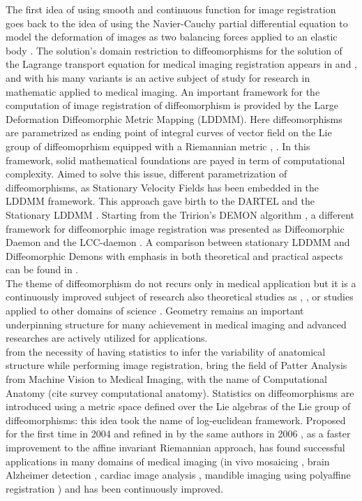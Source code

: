 The first idea of using smooth and continuous function for image registration goes back to the idea of using the Navier-Cauchy partial differential equation to model the deformation of images as two balancing forces applied to an elastic body \cite{Broit:1981}. The solution's domain restriction to diffeomorphisms for the solution of the Lagrange transport equation for medical imaging registration appears in \cite{Dupuis:98:variationalproblems} and \cite{Trouve:98}, and with his many variants is an active subject of study for research in mathematic applied to medical imaging.
An important framework for the computation of image registration of diffeomorphism is provided by the Large Deformation Diffeomorphic Metric Mapping (LDDMM). Here diffeomorphisms are parametrized as ending point of integral curves of vector field on the Lie group of diffeomoprhism equipped with a Riemannian metric \cite{dupuis1998variational}, \cite{beg2005computing}. In this framework, solid mathematical foundations are payed in term of computational complexity. Aimed to solve this issue, different parametrization of diffeomorphisms, as Stationary Velocity Fields \cite{arsigny2006statistics} has been embedded in the LDDMM framework. This approach gave birth to the DARTEL \cite{Ashburner:07} and the Stationary LDDMM \cite{hernandez2007registration}. Starting from the Tririon's DEMON algorithm \cite{thirion1998image}, a different framework for diffeomorphic image registration was presented as Diffeomorphic Daemon \cite{vercauteren2007non} and the LCC-daemon \cite{lorenzi2013lcc} . A comparison between stationary LDDMM and Diffeomorphic Demons with emphasis in both theoretical and practical aspects can be found in \cite{hernandez2008comparing}. \\
The theme of diffeomorphism do not recurs only in medical application but it is a continuously improved subject of research also theoretical studies as \cite{Milnor:84:remarks}, \cite{bauer2011geodesic}, \cite{bauer2010sobolev} or studies applied to other domains of science \cite{Arnold:Khesin:14} \cite{ovsienko1992integrals}. Geometry remains an important underpinning structure for many achievement in medical imaging and advanced researches are actively utilized for applications.\\
from the necessity of having statistics to infer the variability of anatomical structure while performing image registration, bring the field of Patter Analysis from Machine Vision to Medical Imaging, with the name of Computational Anatomy (cite survey computational anatomy). 
Statistics on diffeomorphisms are introduced using a metric space defined over the Lie algebras of the Lie group of diffeomorphisms: this idea took the name of log-euclidean framework. Proposed for the first time in 2004 and refined in by the same authors in 2006 \cite{Arsigny:MRM:06}, as a faster improvement to the affine invariant Riemannian approach, has found successful applications in many domains of medical imaging (in vivo mosaicing \cite{Vercauteren:PHD:08}, brain Alzheimer detection \cite{Lorenzi:PhD:12}, cardiac image analysis \cite{Mansi:IJCV:11}, mandible imaging using polyaffine registration \cite{Seiler:MICCAI:11}) and has been continuously improved.\\
